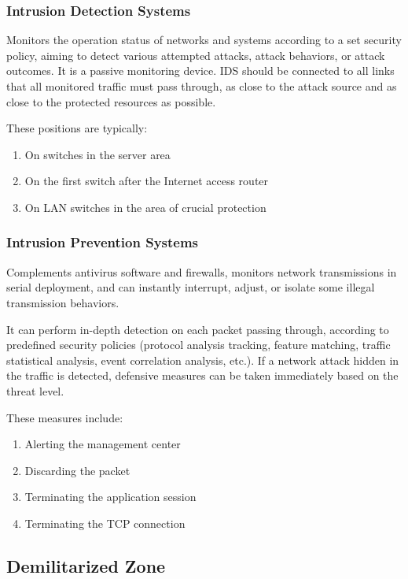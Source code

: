 \documentclass[11pt,journal,compsoc]{IEEEtran}
\begin{document}
\subsubsection{Intrusion Detection Systems}

Monitors the operation status of networks and systems according to a set security policy, aiming to detect various attempted attacks, attack behaviors, or attack outcomes. It is a passive monitoring device. IDS should be connected to all links that all monitored traffic must pass through, as close to the attack source and as close to the protected resources as possible.

These positions are typically:

\begin{enumerate}
    \item On switches in the server area
    \item On the first switch after the Internet access router
    \item On LAN switches in the area of crucial protection
\end{enumerate}


\subsubsection{Intrusion Prevention Systems}

Complements antivirus software and firewalls, monitors network transmissions in serial deployment, and can instantly interrupt, adjust, or isolate some illegal transmission behaviors.

It can perform in-depth detection on each packet passing through, according to predefined security policies (protocol analysis tracking, feature matching, traffic statistical analysis, event correlation analysis, etc.). If a network attack hidden in the traffic is detected, defensive measures can be taken immediately based on the threat level.

These measures include:

\begin{enumerate}
    \item Alerting the management center
    \item Discarding the packet
    \item Terminating the application session
    \item Terminating the TCP connection
\end{enumerate}


\subsection{Demilitarized Zone}
\end{document}
